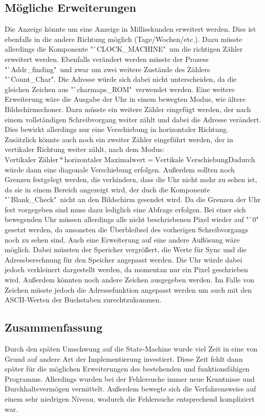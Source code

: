 \documentclass[12pt,a4paper,bibliography=totoc,listof=totoc]{scrartcl}
\begin{document}
\subsection{Mögliche Erweiterungen}
Die Anzeige könnte um eine Anzeige in Millisekunden erweitert werden. Dies ist ebenfalls in die andere Richtung möglich (Tage/Wochen/etc.). 
Dazu müsste allerdings die Komponente "`CLOCK\_MACHINE"\, um die richtigen Zähler erweitert werden. Ebenfalls verändert werden müsste der Prozess 
"`Addr\_finding"\, und zwar um zwei weitere Zustände des Zählers "`Count\_Char". Die Adresse würde sich dabei nicht unterscheiden, da die gleichen 
Zeichen aus "`charmaps\_ROM" \,verwendet werden.\newline
Eine weitere Erweiterung wäre die Ausgabe der Uhr in einem bewegten Modus, wie ältere Bildschirmschoner. Dazu müsste ein weitere Zähler eingefügt 
werden, der nach einem vollständigen Schreibvorgang weiter zählt und dabei die Adresse verändert. Dies bewirkt allerdings nur eine Verschiebung in 
horizontaler Richtung. Zusätzlich könnte auch noch ein zweiter Zähler eingeführt werden, der in vertikaler Richtung weiter zählt, nach dem 
Modus: \newline $\text{Vertikaler Zähler} * \text{horizontaler Maximalwert} = \text{Vertikale Verschiebung}$\newline Dadurch würde dann eine 
diagonale Verschiebung erfolgen. Außerdem sollten noch Grenzen festgelegt 
werden, die verhindern, dass die Uhr nicht mehr zu sehen ist, da sie in einem Bereich angezeigt wird, der duch die Komponente "`Blank\_Check"\, 
nicht an 
den Bildschirm gesendet wird. Da die Grenzen der Uhr fest vorgegeben sind muss dazu lediglich eine Abfrage erfolgen.
Bei einer sich bewegenden Uhr müssen allerdings alle nicht beschriebenen Pixel wieder auf "`0" \,gesetzt werden, da ansonsten die Überbleibsel des 
vorherigen Schreibvorgangs noch zu sehen sind.\newline
Auch eine Erweiterung auf eine andere Auflösung wäre möglich. Dabei müssten der Spericher vergrößert, die Werte für Sync und die Adressberechnung 
für den Speicher angepasst werden. Die Uhr würde dabei jedoch verkleinert dargestellt werden, da momentan nur ein Pixel geschrieben wird. Außerdem 
könnten noch andere Zeichen ausgegeben werden. Im Falle von Zeichen müsste jedoch die Adressefunktion angepasst werden um auch mit den ASCII-Werten 
der Buchstaben zurechtzukommen.

\subsection{Zusammenfassung}
Durch den späten Umschwung auf die State-Machine wurde viel Zeit in eine von Grund auf andere Art der Implementierung investiert. 
Diese Zeit fehlt dann später für die möglichen Erweiterungen des bestehenden und funktionsfähigen Programms. Allerdings wurden bei der 
Fehlersuche immer neue Kenntnisse und Durchhaltevermögen vermittelt. Außerdem bewegte sich die Verfahrensweise auf einem sehr niedrigen Niveau, 
wodurch die Fehlersuche entsprechend kompliziert war.
\end{document}
